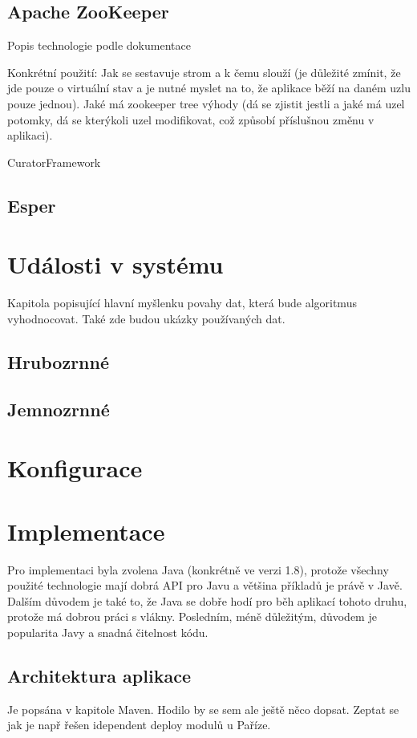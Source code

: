 \documentclass[
  digital, %
  table,   %
  nolof,     %
  nolot,     %
  twoside,
  nocover,
  monochrome,
  12pt
]{fithesis3}
\begin{document}
\subsection{Apache ZooKeeper}
\label{sec:zookeeper}
Popis technologie podle dokumentace

Konkrétní použití: Jak se sestavuje strom a k čemu slouží (je důležité zmínit, že jde pouze o virtuální stav a je nutné myslet na to, že aplikace běží na daném uzlu pouze jednou). Jaké má zookeeper tree výhody (dá se zjistit jestli a jaké má uzel potomky, dá se kterýkoli uzel modifikovat, což způsobí příslušnou změnu v aplikaci).

CuratorFramework
\subsection{Esper}
\label{sec:esper}
\section{Události v systému}
\label{sec:udalosti-v-systemu}
Kapitola popisující hlavní myšlenku povahy dat, která bude algoritmus vyhodnocovat. Také zde budou ukázky používaných dat.
\subsection{Hrubozrnné}
\subsection{Jemnozrnné}
\section{Konfigurace}
\section{Implementace}
Pro implementaci byla zvolena Java (konkrétně ve verzi 1.8), protože všechny použité technologie mají dobrá API pro Javu a většina příkladů je právě v Javě. Dalším důvodem je také to, že Java se dobře hodí pro běh aplikací tohoto druhu, protože má dobrou práci s vlákny. Posledním, méně důležitým, důvodem je popularita Javy a snadná čitelnost kódu.
\subsection*{Architektura aplikace}
Je popsána v kapitole Maven. Hodilo by se sem ale ještě něco dopsat. Zeptat se jak je např řešen idependent deploy modulů u Paříze. 
\end{document}
